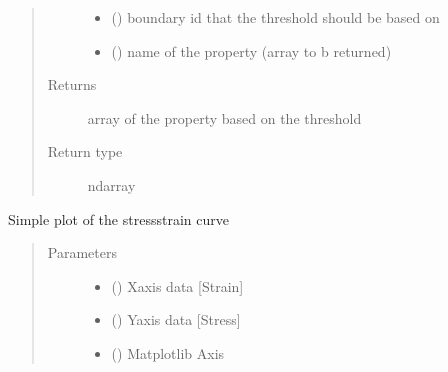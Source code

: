 \documentclass[letterpaper,10pt,english]{sphinxmanual}
\begin{document}
\begin{fulllineitems}
\begin{fulllineitems}
\begin{quote}
\begin{description}
\begin{itemize}
\item {} 
 () \textendash{} boundary id that the threshold should be based on

\item {} 
 () \textendash{} name of the property (array to b returned)

\end{itemize}

\item[{Returns}] \leavevmode
array of the property based on the threshold

\item[{Return type}] \leavevmode
ndarray

\end{description}\end{quote}

\end{fulllineitems}


\begin{fulllineitems}
\label{\detokenize{openfdem:openfdem.openfdem.Model.plot_stress_strain}}
Simple plot of the stress\sphinxhyphen{}strain curve
\begin{quote}\begin{description}
\item[{Parameters}] \leavevmode\begin{itemize}
\item {} 
 () \textendash{} X\sphinxhyphen{}axis data {[}Strain{]}

\item {} 
 () \textendash{} Y\sphinxhyphen{}axis data {[}Stress{]}

\item {} 
 () \textendash{} Matplotlib Axis


\end{itemize}
\end{description}
\end{quote}
\end{fulllineitems}
\end{fulllineitems}
\end{document}
